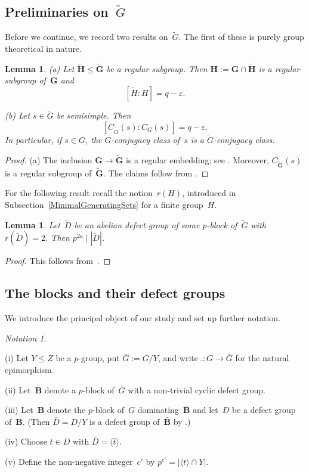 \documentclass[12pt]{amsart}
\newcommand{\bG}{{\mathbf{G}}}      %
\newcommand{\bB}{{\mathbf{B}}}
\newcommand{\bH}{{\mathbf{H}}}
\newtheorem{lem}[thm]{Lemma}
\theoremstyle{theorem}
\theoremstyle{definition}
\theoremstyle{remark}
\newtheorem{notn}[thm]{Notation}
\begin{document}
\addtocounter{subsection}{1}
\subsection{Preliminaries on~$\tilde{G}$}
Before we continue, we record two results on~$\tilde{G}$. The first of these is
purely group theoretical in nature.

\addtocounter{thm}{1}
\begin{lem}
\label{CentralizersAndDeterminants}
{\rm (a)} Let $\tilde{\bH} \leq \tilde{\bG}$ be a regular subgroup. Then 
$\bH := \bG \cap \tilde{\bH}$ is a regular subgroup of~$\bG$ and
$$[\tilde{H}\colon\!H] = q - \varepsilon.$$

{\rm (b)} Let $s \in \tilde{G}$ be semisimple. Then
$$[C_{\tilde{G}}( s )\colon\!C_G( s )] = q - \varepsilon.$$
In particular, if $s \in G$, the $G$-conjugacy class of~$s$ is a
$\tilde{G}$-conjugacy class.
\end{lem}
\begin{proof}
(a) The inclusion $\bG \rightarrow \tilde{\bG}$ is a regular embedding; see
\cite[Definition~$1.7.1$]{GeMa}. Moreover,  $C_{\tilde{\bG}}( s )$ is a regular 
subgroup of~$\tilde{\bG}$.
The claims follow from \cite[Lemma~$2.5.3$]{HL25}.
\end{proof}

For the following result recall the notion~$r(H)$, introduced in 
Subsection~\ref{MinimalGeneratingSets} for a finite group~$H$.
\begin{lem}
\label{RankTwoDefectGroup}
Let~$\tilde{D}$ be an abelian defect group of some $p$-block of~$\tilde{G}$
with $r(\tilde{D}) = 2$. Then $p^{2a} \mid |\tilde{D}|$.
\end{lem}
\begin{proof}
This follows from~\cite[Theorem~(3C)]{fs2}.
\end{proof}

\addtocounter{subsection}{2}
\subsection{The blocks and their defect groups}
We introduce the principal object of our study and set up further notation. 

\addtocounter{thm}{1}
\begin{notn}
\label{HypoII}
{\rm 
(i) Let $Y \leq Z$ be a $p$-group, put $\bar{G} := G/Y$, and write 
$\bar{\ }: G \rightarrow \bar{G}$ for the natural epimorphism. 

(ii) Let~$\bar{\bB}$ denote a $p$-block of~$\bar{G}$ with a non-trivial cyclic 
defect group. 

(iii) Let~$\bB$ denote the $p$-block of~$G$ dominating~$\bar{\bB}$ and let~$D$ 
be a defect group of~$\bB$. (Then $\bar{D} = D/Y$ is a defect group 
of~$\bar{\bB}$ by \cite[Lemma~$2.4.1$]{HL25}.)

(iv) Choose $t \in D$ with $\bar{D} = \langle \bar{t} \rangle$.

(v) Define the non-negative integer~$c'$ by 
$p^{c'} = |\langle t \rangle \cap Y|$. 
}\hfill{\textsquare}
\end{notn}
\end{document}
